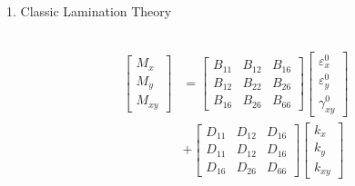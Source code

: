 \documentclass{beamer}
\begin{document}
\begin{frame}{1. Classic Lamination Theory}
\begin{columns}[c]
\begin{column}{0.5\textwidth}
\begin{equation}
\begin{array}{l}
		\begin{aligned}
			\begin{bmatrix}
				M_x \\
				M_y \\
				M_{xy}
			\end{bmatrix}
			&=
			\begin{bmatrix}
				B_{11} & B_{12} & B_{16} \\
				B_{12} & B_{22} & B_{26} \\
				B_{16} & B_{26} & B_{66} 
			\end{bmatrix}
			\begin{bmatrix}
				\varepsilon_x^0 \\
				\varepsilon_y^0 \\
				\gamma_{xy}^0
			\end{bmatrix} \\ 
			&+  
			\begin{bmatrix}
				D_{11} & D_{12} & D_{16} \\
				D_{11} & D_{12} & D_{16} \\
				D_{16} & D_{26} & D_{66} 
			\end{bmatrix}
			\begin{bmatrix}
				k_x \\
				k_y \\
				k_{xy} 
			\end{bmatrix}
		\end{aligned}
			\end{array}
		\end{equation}
	\end{column}
\end{columns}
\end{frame}
\end{document}

